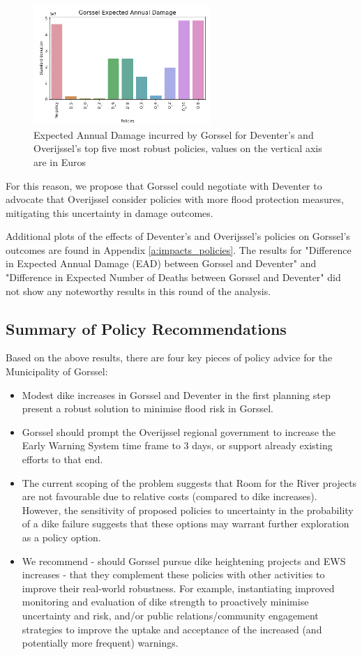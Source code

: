 \begin{figure}[h!]
    \centering
    \includegraphics[width=0.6\textwidth]{report/figures/results/spreads/EAD-spread-g.png}
    \caption{Expected Annual Damage incurred by Gorssel for Deventer's and Overijssel's top five most robust policies, values on the vertical axis are in Euros}
    \label{fig:EAD-spread}
\end{figure}

For this reason, we propose that Gorssel could negotiate with Deventer to advocate that Overijssel consider policies with more flood protection measures, mitigating this uncertainty in damage outcomes.

Additional plots of the effects of Deventer's and Overijssel's policies on Gorssel's outcomes are found in Appendix \ref{a:impacts_policies}.
The results for "Difference in Expected Annual Damage (EAD) between Gorssel and Deventer" and "Difference in Expected Number of Deaths between Gorssel and Deventer" did not show any noteworthy results in this round of the analysis.  
\subsection{Summary of Policy Recommendations}
Based on the above results, there are four key pieces of policy advice for the Municipality of Gorssel:
\begin{itemize}
    \item Modest dike increases in Gorssel and Deventer in the first planning step present a robust solution to minimise flood risk in Gorssel.
    \item Gorssel should prompt the Overijssel regional government to increase the Early Warning System time frame to 3 days, or support already existing efforts to that end.
    \item The current scoping of the problem suggests that Room for the River projects are not favourable due to relative costs (compared to dike increases). However, the sensitivity of proposed policies to uncertainty in the probability of a dike failure suggests that these options may warrant further exploration as a policy option.
    \item We recommend - should Gorssel pursue dike heightening projects and EWS increases - that they complement these policies with other activities to improve their real-world robustness. For example, instantiating improved monitoring and evaluation of dike strength to proactively minimise uncertainty and risk, and/or public relations/community engagement strategies to improve the uptake and acceptance of the increased (and potentially more frequent) warnings.
\end{itemize}
